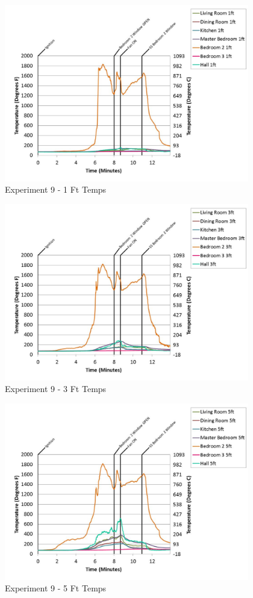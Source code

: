 \documentclass{article}
\begin{document}
\begin{appendices}
	\begin{figure}[h!]
		\centering
		\includegraphics[height=3.05in]{0_Images/Results_Charts/Exp_9_Charts/1FtTemps.pdf}
		\caption{Experiment 9 - 1 Ft Temps}
	\end{figure}
 

	\begin{figure}[h!]
		\centering
		\includegraphics[height=3.05in]{0_Images/Results_Charts/Exp_9_Charts/3FtTemps.pdf}
		\caption{Experiment 9 - 3 Ft Temps}
	\end{figure}
 
	\clearpage

	\begin{figure}[h!]
		\centering
		\includegraphics[height=3.05in]{0_Images/Results_Charts/Exp_9_Charts/5FtTemps.pdf}
		\caption{Experiment 9 - 5 Ft Temps}
	\end{figure}
 


\end{appendices}
\end{document}
